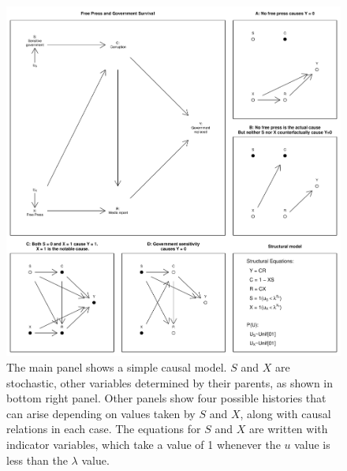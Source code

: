 \documentclass[12pt,]{book}
\begin{document}
\begin{figure}

{\centering \includegraphics[width=\textwidth]{ii_files/figure-latex/running2-1} 

}

\caption{The main panel shows a simple causal model. $S$ and $X$ are stochastic, other variables determined by their parents, as shown in bottom right panel. Other panels show four possible histories that can arise depending on values taken by $S$ and $X$, along with causal relations in each case. The equations for $S$ and $X$ are written with indicator variables, which take a value of 1 whenever the $u$ value is less than the $\lambda$ value.}\label{fig:running2}
\end{figure}
\end{document}
